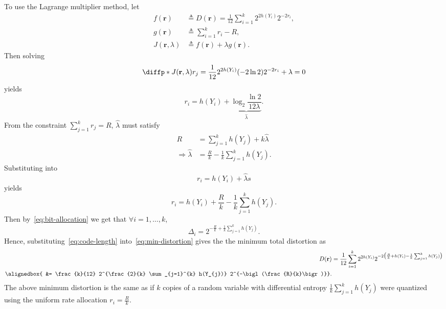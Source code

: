 \documentclass[
  coursecode={MTHE 477},
  assignmentname={Homework \homeworknumber},
  studentnumber=20053722,
  name={Bryan Hoang},
  draft,
]{
  ltxanswer%
}
\begin{document}
\begin{questions}
\begin{parts}
\begin{solution}
        To use the Lagrange multiplier method, let
        \begin{align*}
          f(\mathbf{r})          &\triangleq D(\mathbf{r}) = \frac{1}{12} \sum_{i=1}^{k} 2^{2 h(Y_{i})} 2^{-2 r_{i}}, \\
          g(\mathbf{r})          &\triangleq \sum_{i=1}^{k} r_{i} - R,                                                \\
          J(\mathbf{r}, \lambda) &\triangleq f(\mathbf{r}) + \lambda g(\mathbf{r}).
        \end{align*}
        Then solving
        \begin{equation*}
          \diffp*{J(\mathbf{r}, \lambda)}{r_{j}} = \frac{1}{12} 2^{2 h(Y_{i})} (-2 \ln 2) 2^{-2 r_{i}} + \lambda = 0
        \end{equation*}
        yields
        \begin{equation*}
          r_{i} = h(Y_{i}) + \underbrace{\log_{2} \frac{\ln 2}{12 \lambda}}_{\hat{\lambda}}.
        \end{equation*}
        From the constraint \(\sum_{j=1}^{k} r_{j} = R\), \(\hat{\lambda}\) must satisfy
        \begin{align*}
          R                         &= \sum_{j=1}^{k} h(Y_{j}) + k \hat{\lambda}          \\
          \Rightarrow \hat{\lambda} &= \frac{R}{k} - \frac{1}{k} \sum_{j=1}^{k} h(Y_{j}).
        \end{align*}
        Substituting into
        \begin{equation*}
          r_{i} = h(Y_{i}) + \hat{\lambda}s
        \end{equation*}
        yields
        \begin{equation}\label{eq:code-length}
          r_{i} = h(Y_{i}) + \frac{R}{k} - \frac{1}{k} \sum_{j=1}^{k} h(Y_{j}).
        \end{equation}
        Then by~\eqref{eq:bit-allocation} we get that \(\forall i = 1, \dotsc, k\),
        \begin{equation*}
          \boxed{\Delta_{i} = 2^{-\frac{R}{k} + \frac{1}{k} \sum_{j=1}^{k} h(Y_{j})}}.
        \end{equation*}
        Hence, substituting~\eqref{eq:code-length} into~\eqref{eq:min-distortion} gives the the minimum total distortion as
        \begin{align*}
          D(\mathbf{r}) &= \frac{1}{12} \sum_{i=1}^{k} 2^{2 h(Y_{i})} 2^{-2\bigl(\frac{R}{k} + h(Y_{i}) - \frac{1}{k} \sum_{j=1}^{k} h(Y_{j})\bigr)} \\
          \alignedbox{  &= \frac{k}{12} 2^{\frac{2}{k} \sum_{j=1}^{k} h(Y_{j})} 2^{-\bigl(\frac{R}{k}\bigr)}}.
        \end{align*}
        The above minimum distortion is the same as if \(k\) copies of a random variable with differential entropy \(\frac{1}{k} \sum_{j=1}^{k} h(Y_{j})\) were quantized using the uniform rate allocation \(r_{i} = \frac{R}{k}\).
      \end{solution}


\end{parts}
\end{questions}
\end{document}
